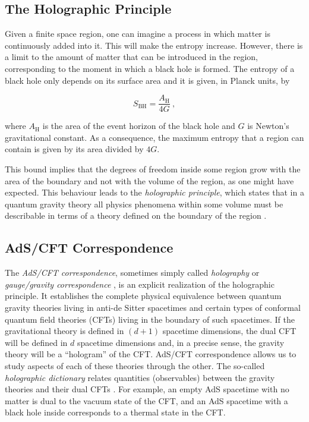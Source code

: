 \documentclass[twocolumn]{revtex4}
\providecommand{\eq}[2]{
    \begin{equation}
        #2
    \label{eq:#1}
    \end{equation}
}
\begin{document}
\subsection{The Holographic Principle} \label{ss:Holography}

Given a finite space region, one can imagine a process in which matter is continuously added into it. This will make the entropy increase. However, there is a limit to the amount of matter that can be introduced in the region, corresponding to the moment in which a black hole is formed. The entropy of a black hole only depends on its surface area and it is given, in Planck units, by \cite{bekenstein_black_1973, hawking_particle_1975}
\eq{BH}{
    S_\text{BH} = \frac{ A_\text{H} }{ 4 G } \ ,
}
where $A_\text{H}$ is the area of the event horizon of the black hole and $G$ is Newton's gravitational constant. As a consequence, the maximum entropy that a region can contain is given by its area divided by $4G$.

This bound implies that the degrees of freedom inside some region grow with the area of the boundary and not with the volume of the region, as one might have expected. This behaviour leads to the \textit{holographic principle}, which states that in a quantum gravity theory all physics phenomena within some volume must be describable in terms of a theory defined on the boundary of the region \cite{t_hooft_dimensional_2009}.


\subsection{AdS/CFT Correspondence} \label{ss:AdS/CFT}

The \textit{AdS/CFT correspondence}, sometimes simply called \textit{holography} or \textit{gauge/gravity correspondence} \cite{maldacena_large_1999}, is an explicit realization of the holographic principle. It establishes the complete physical equivalence between quantum gravity theories living in anti-de Sitter spacetimes and certain types of conformal quantum field theories (CFTs) living in the boundary of such spacetimes. If the gravitational theory is defined in $(d+1)$ spacetime dimensions, the dual CFT will be defined in $d$ spacetime dimensions and, in a precise sense, the gravity theory will be a ``hologram'' of the CFT. AdS/CFT correspondence allows us to study aspects of each of these theories through the other. The so-called \textit{holographic dictionary} relates quantities (observables) between the gravity theories and their dual CFTs \cite{witten_anti_1998, gubser_gauge_1998}. For example, an empty AdS spacetime with no matter is dual to the vacuum state of the CFT, and an AdS spacetime with a black hole inside corresponds to a thermal state in the CFT.
\end{document}
